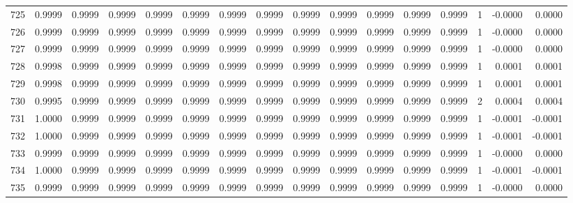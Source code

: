 \begin{tabular}{lrrrrrrrrrrrrrrr}
725 &      0.9999 &  0.9999 &  0.9999 &  0.9999 &  0.9999 &  0.9999 &  0.9999 &  0.9999 &  0.9999 &  0.9999 &   0.9999 &     0.9999 &      1 &                   -0.0000 &                     0.0000 \\
726 &      0.9999 &  0.9999 &  0.9999 &  0.9999 &  0.9999 &  0.9999 &  0.9999 &  0.9999 &  0.9999 &  0.9999 &   0.9999 &     0.9999 &      1 &                   -0.0000 &                     0.0000 \\
727 &      0.9999 &  0.9999 &  0.9999 &  0.9999 &  0.9999 &  0.9999 &  0.9999 &  0.9999 &  0.9999 &  0.9999 &   0.9999 &     0.9999 &      1 &                   -0.0000 &                     0.0000 \\
728 &      0.9998 &  0.9999 &  0.9999 &  0.9999 &  0.9999 &  0.9999 &  0.9999 &  0.9999 &  0.9999 &  0.9999 &   0.9999 &     0.9999 &      1 &                    0.0001 &                     0.0001 \\
729 &      0.9998 &  0.9999 &  0.9999 &  0.9999 &  0.9999 &  0.9999 &  0.9999 &  0.9999 &  0.9999 &  0.9999 &   0.9999 &     0.9999 &      1 &                    0.0001 &                     0.0001 \\
730 &      0.9995 &  0.9999 &  0.9999 &  0.9999 &  0.9999 &  0.9999 &  0.9999 &  0.9999 &  0.9999 &  0.9999 &   0.9999 &     0.9999 &      2 &                    0.0004 &                     0.0004 \\
731 &      1.0000 &  0.9999 &  0.9999 &  0.9999 &  0.9999 &  0.9999 &  0.9999 &  0.9999 &  0.9999 &  0.9999 &   0.9999 &     0.9999 &      1 &                   -0.0001 &                    -0.0001 \\
732 &      1.0000 &  0.9999 &  0.9999 &  0.9999 &  0.9999 &  0.9999 &  0.9999 &  0.9999 &  0.9999 &  0.9999 &   0.9999 &     0.9999 &      1 &                   -0.0001 &                    -0.0001 \\
733 &      0.9999 &  0.9999 &  0.9999 &  0.9999 &  0.9999 &  0.9999 &  0.9999 &  0.9999 &  0.9999 &  0.9999 &   0.9999 &     0.9999 &      1 &                   -0.0000 &                     0.0000 \\
734 &      1.0000 &  0.9999 &  0.9999 &  0.9999 &  0.9999 &  0.9999 &  0.9999 &  0.9999 &  0.9999 &  0.9999 &   0.9999 &     0.9999 &      1 &                   -0.0001 &                    -0.0001 \\
735 &      0.9999 &  0.9999 &  0.9999 &  0.9999 &  0.9999 &  0.9999 &  0.9999 &  0.9999 &  0.9999 &  0.9999 &   0.9999 &     0.9999 &      1 &                   -0.0000 &                     0.0000 \\

\end{tabular}
